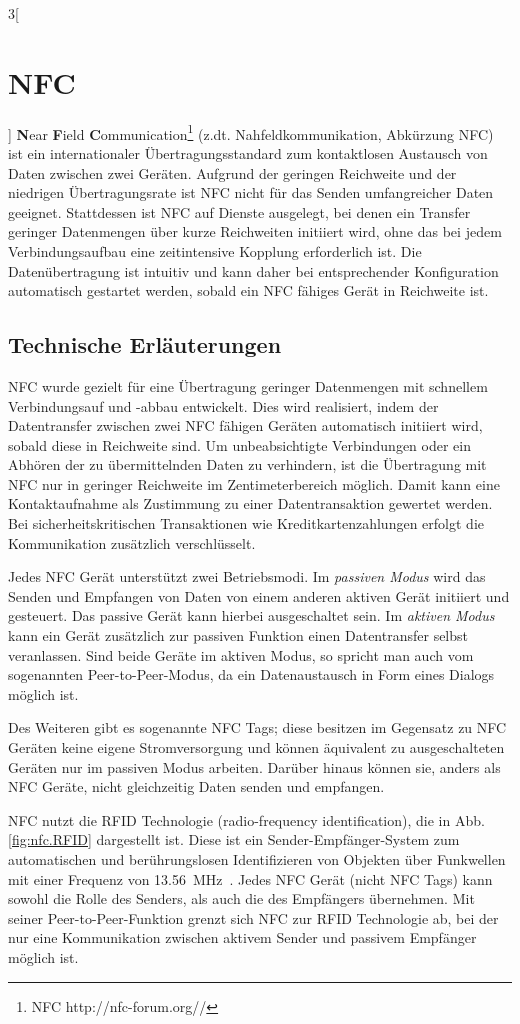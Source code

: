 \begin{multicols}{3}[\section{NFC}]
\textbf{N}ear \textbf{F}ield \textbf{C}ommunication\footnote{NFC {http://nfc-forum.org//}} (z.dt. Nahfeldkommunikation, Abkürzung NFC) ist ein internationaler Übertragungsstandard zum kontaktlosen Austausch von Daten zwischen zwei Geräten. Aufgrund der geringen Reichweite und der niedrigen Übertragungsrate ist NFC nicht für das Senden umfangreicher Daten geeignet. Stattdessen ist NFC auf Dienste ausgelegt, bei denen ein Transfer geringer Datenmengen über kurze Reichweiten initiiert wird, ohne das bei jedem Verbindungsaufbau eine zeitintensive Kopplung erforderlich ist.
Die Datenübertragung ist intuitiv und kann daher bei entsprechender Konfiguration automatisch gestartet werden, sobald ein NFC fähiges Gerät in Reichweite ist.~\cite{nfc.1,nfc.2,nfc.12}


\subsection*{Technische Erläuterungen}
NFC wurde gezielt für eine Übertragung geringer Datenmengen mit schnellem Verbindungsauf und -abbau entwickelt. Dies wird realisiert, indem der Datentransfer zwischen zwei NFC fähigen Geräten automatisch initiiert wird, sobald diese in Reichweite sind. Um unbeabsichtigte Verbindungen oder ein Abhören der zu übermittelnden Daten zu verhindern, ist die Übertragung mit NFC nur in geringer Reichweite im Zentimeterbereich möglich. Damit kann eine Kontaktaufnahme als Zustimmung zu einer Datentransaktion gewertet werden. Bei sicherheitskritischen Transaktionen wie Kreditkartenzahlungen erfolgt die Kommunikation zusätzlich verschlüsselt.

Jedes NFC Gerät unterstützt zwei Betriebsmodi. Im \textit{passiven Modus} wird das Senden und Empfangen von Daten von einem anderen aktiven Gerät initiiert und gesteuert. Das passive Gerät kann hierbei ausgeschaltet sein. 
Im \textit{aktiven Modus} kann ein Gerät zusätzlich zur passiven Funktion einen Datentransfer selbst veranlassen. Sind beide Geräte im aktiven Modus, so spricht man auch vom sogenannten Peer-to-Peer-Modus, da ein Datenaustausch in Form eines Dialogs möglich ist. 

Des Weiteren gibt es sogenannte NFC Tags; diese besitzen im Gegensatz zu NFC Geräten keine eigene Stromversorgung und können äquivalent zu ausgeschalteten Geräten nur im passiven Modus arbeiten. Darüber hinaus können sie, anders als NFC Geräte, nicht gleichzeitig Daten senden und empfangen.

NFC nutzt die RFID Technologie (radio-frequency identification), die in Abb. \ref{fig:nfc.RFID} dargestellt ist. Diese ist ein Sender-Empfänger-System zum automatischen und berührungslosen Identifizieren von Objekten über Funkwellen mit einer Frequenz von 13.56~MHz~\cite{nfc.9}. Jedes NFC Gerät (nicht NFC Tags) kann sowohl die Rolle des Senders, als auch die des Empfängers übernehmen. Mit seiner Peer-to-Peer-Funktion grenzt sich NFC zur RFID Technologie ab, bei der nur eine Kommunikation zwischen aktivem Sender und passivem Empfänger möglich ist. 


\end{multicols}
